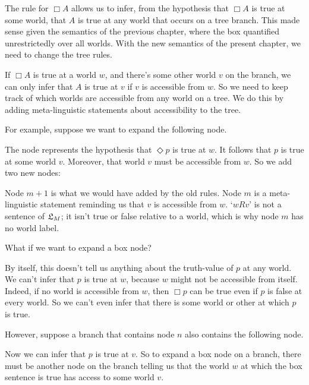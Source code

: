 \bigskip
\noindent
The rule for $\Box A$ allows us to infer, from the hypothesis that $\Box A$ is
true at some world, that $A$ is true at any world that occurs on a tree branch.
This made sense given the semantics of the previous chapter, where the box
quantified unrestrictedly over all worlds. With the new semantics of the present
chapter, we need to change the tree rules.

If $\Box A$ is true at a world $w$, and there's some other world $v$ on the
branch, we can only infer that $A$ is true at $v$ if $v$ is accessible from $w$.
So we need to keep track of which worlds are accessible from any world on a
tree. We do this by adding meta-linguistic statements about accessibility to the
tree.

For example, suppose we want to expand the following node.
%
\begin{center}
\end{center}
%
The node represents the hypothesis that $\Diamond p$ is true at $w$.
It follows that $p$ is true at some world $v$. Moreover, that world
$v$ must be accessible from $w$. So we add two new nodes:

\begin{center}
\end{center}
%
Node $m+1$ is what we would have added by the old rules. Node $m$ is a
meta-linguistic statement reminding us that $v$ is accessible from
$w$. `$wRv$' is not a sentence of $\mathfrak{L}_M$; it isn't true or false
relative to a world, which is why node $m$ has no world label.

What if we want to expand a box node?
%
\begin{center}
\end{center}
%
By itself, this doesn't tell us anything about the truth-value of $p$
at any world. We can't infer that $p$ is true at $w$, because $w$
might not be accessible from itself. Indeed, if no world is accessible
from $w$, then $\Box p$ can be true even if $p$ is false at every
world. So we can't even infer that there is some world or other at
which $p$ is true.

However, suppose a branch that contains node $n$ also contains the
following node.
\begin{center}
\end{center}
Now we can infer that $p$ is true at $v$. So to expand a box node on a
branch, there must be another node on the branch telling us that
the world $w$ at which the box sentence is true has access to some
world $v$.

